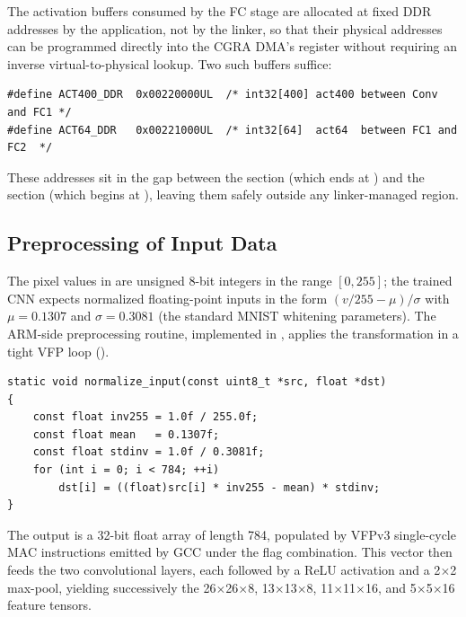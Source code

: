 The activation buffers consumed by the FC stage are allocated at
fixed DDR addresses by the application, not by the linker, so that
their physical addresses can be programmed directly into the CGRA
DMA's  register without requiring an inverse
virtual-to-physical lookup. Two such buffers suffice:

\begin{lstlisting}[caption={Fixed DDR staging addresses for inter-layer
activations (from the demo source).},label={lst:staging}]
#define ACT400_DDR  0x00220000UL  /* int32[400] act400 between Conv and FC1 */
#define ACT64_DDR   0x00221000UL  /* int32[64]  act64  between FC1 and FC2  */
\end{lstlisting}

These addresses sit in the gap between the  section
(which ends at ) and the  section
(which begins at ), leaving them safely outside any
linker-managed region.

\subsection{Preprocessing of Input Data}
\label{ssec:preprocess}

The pixel values in  are unsigned 8-bit integers
in the range $[0, 255]$; the trained CNN expects normalized
floating-point inputs in the form $(v/255 - \mu)/\sigma$ with
$\mu = 0.1307$ and $\sigma = 0.3081$ (the standard MNIST whitening
parameters). The ARM-side preprocessing routine, implemented in
, applies the transformation
in a tight VFP loop ().

\begin{lstlisting}[caption={Pixel normalization with VFPv3 hard-float.},label={lst:normalize}]
static void normalize_input(const uint8_t *src, float *dst)
{
    const float inv255 = 1.0f / 255.0f;
    const float mean   = 0.1307f;
    const float stdinv = 1.0f / 0.3081f;
    for (int i = 0; i < 784; ++i)
        dst[i] = ((float)src[i] * inv255 - mean) * stdinv;
}
\end{lstlisting}

The output  is a 32-bit float array of length 784, populated
by VFPv3 single-cycle MAC instructions emitted by GCC under the
 flag combination. This vector then
feeds the two convolutional layers, each followed by a ReLU activation
and a 2$\times$2 max-pool, yielding successively the 26$\times$26$\times$8,
13$\times$13$\times$8, 11$\times$11$\times$16, and 5$\times$5$\times$16
feature tensors.

